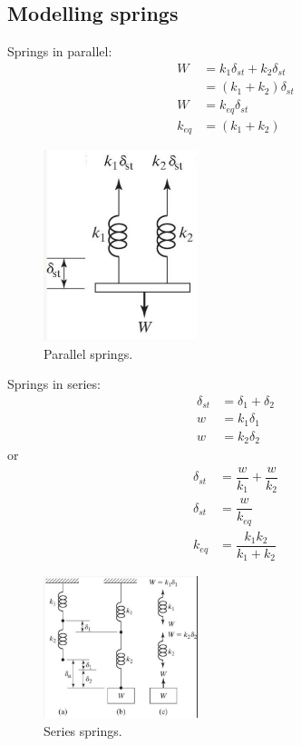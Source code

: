 \documentclass[class=report, crop=false, 12pt,a4paper]{standalone}
\begin{document}
\subsection{Modelling springs}
Springs in parallel:
\begin{align}
    W &= k_1 \delta_{st} + k_2 \delta_{st}\\
    &= \left(k_1 + k_2 \right)\delta_{st}\\
    W &= k_{eq} \delta_{st}\\
    k_{eq} &= \left(k_1 + k_2\right)
\end{align}
\begin{figure}[H]
    \centering
    \includegraphics[width = 0.4\textwidth]{../img/diagram16.jpg}
    \caption{Parallel springs.}
\end{figure}
Springs in series:
\begin{align}
    \delta_{st} &= \delta_1 + \delta_2\\
    w &= k_1 \delta_1\\
    w &= k_2 \delta_2
\end{align}
or
\begin{align}
    \delta_{st} &= \dfrac{w}{k_1} + \dfrac{w}{k_2}\\
    \delta_{st} &= \dfrac{w}{k_{eq}}\\
    k_{eq} &= \dfrac{k_1k_2}{k_1 + k_2}
\end{align}
\begin{figure}
    \centering
    \includegraphics[width = 0.4\textwidth]{../img/diagram17.jpg}
    \caption{Series springs.}
\end{figure}
\end{document}
